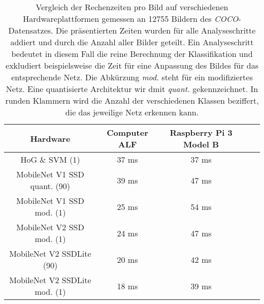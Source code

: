 \begin{table}[H]
	\caption{Vergleich der Rechenzeiten pro Bild auf verschiedenen Hardwareplattformen gemessen an 12755 Bildern des \textit{COCO}-Datensatzes. Die präsentierten Zeiten wurden für alle Analyseschritte addiert und durch die Anzahl aller Bilder geteilt. Ein Analyseschritt bedeutet in diesem Fall die reine Berechnung der Klassifikation und exkludiert beispielsweise die Zeit für eine Anpassung des Bildes für das entsprechende Netz. Die Abkürzung \textit{mod.} steht für ein modifiziertes Netz. Eine quantisierte Architektur wir dmit \textit{quant.} gekennzeichnet. In runden Klammern wird die Anzahl der verschiedenen Klassen beziffert, die das jeweilige Netz erkennen kann.    }
	\begin{center}
		
	\begin{tabular}{|c|c|c|c|c|}
		\hline
		\multicolumn{1}{|c|}{Hardware} & \multicolumn{1}{c|}{Computer ALF}  & \multicolumn{1}{c|}{Raspberry Pi 3 Model B} \\ \hline
		HoG \& SVM (1)					&37 ms 				& 37 ms 	 \\
		MobileNet V1 SSD quant. (90)	&39	ms				&47	ms	 	 \\
		MobileNet V1 SSD mod. (1)		&25 ms				& 54 ms \\
		MobileNet V2 SSD mod. (1)		&24 ms 		 		&47 ms \\
		MobileNet V2 SSDLite (90)		&20 ms	 		&42 ms	 \\
		MobileNet V2 SSDLite mod. (1)	&18 ms					&39 ms \\
		
		\hline
	\end{tabular}
	\end{center}

	\label{fig: zeitentab}
\end{table}
